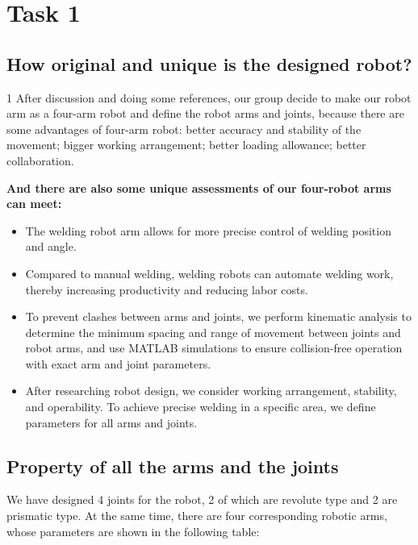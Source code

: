 \section{Task 1}
\FloatBarrier %


\subsection{How original and unique is the designed robot?}

1
After discussion and doing some references, our group decide to make our robot arm as a four-arm robot and define the robot arms and joints, because there are some advantages of four-arm robot: better accuracy and stability of the movement; bigger working arrangement; better loading allowance; better collaboration.

\textbf{And there are also some unique assessments of our four-robot arms can meet:}
\begin{itemize}
    \item The welding robot arm allows for more precise control of welding position and angle.
    \item Compared to manual welding, welding robots can automate welding work, thereby increasing productivity and reducing labor costs.
    \item To prevent clashes between arms and joints, we perform kinematic analysis to determine the minimum spacing and range of movement between joints and robot arms, and use MATLAB simulations to ensure collision-free operation with exact arm and joint parameters.
    \item After researching robot design, we consider working arrangement, stability, and operability. To achieve precise welding in a specific area, we define parameters for all arms and joints.
\end{itemize}

\subsection{Property of all the arms and the joints}

We have designed 4 joints for the robot, 2 of which are revolute type and 2 are prismatic type. At the same time, there are four corresponding robotic arms, whose parameters are shown in the following table:

